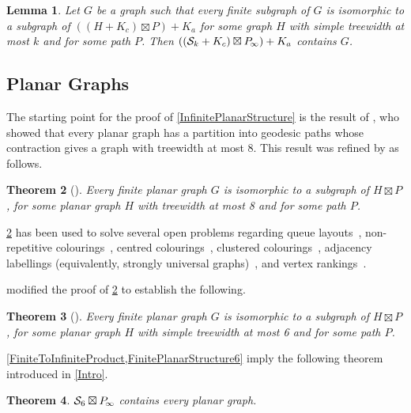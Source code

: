 \documentclass[a4paper,11pt]{article}
\theoremstyle{plain}
\newtheorem{thm}{Theorem}[section]
\newtheorem{lem}[thm]{Lemma}
\theoremstyle{definition}
\newcommand{\PP}{P_{\hspace{-0.25ex}\infty}}
\renewcommand{\SS}{\mathcal{S}}
\begin{document}
\begin{lem}
\label{FiniteToInfiniteSimple}
Let $G$ be a graph such that every finite subgraph of $G$ is isomorphic to a subgraph of $( (H+K_c) \boxtimes P)+K_a$ for some graph $H$ with simple treewidth at most $k$ and for some path $P$. Then $( (\SS_k+K_c) \boxtimes \PP)+K_a$ contains $G$.
\end{lem}

\subsection{Planar Graphs}
\label{PlanarGraphs}

The starting point for the proof of \cref{InfinitePlanarStructure} is the result of \citet{PS18}, who showed that every planar graph has a partition into geodesic paths whose contraction gives a graph with treewidth at most 8. This result was refined by \citet{DJMMUW20} as follows. 

\begin{thm}[\citep{DJMMUW20}]
\label{FinitePlanarStructure}
Every finite planar graph $G$ is isomorphic to a subgraph of $H\boxtimes P$, for some planar graph $H$ with  treewidth at most 8 and for some path $P$.
\end{thm}

\cref{FinitePlanarStructure} has been used to solve several open problems regarding queue layouts~\citep{DJMMUW20}, non-repetitive colourings~\citep{DEJWW20}, centred colourings~\citep{DFMS21}, clustered colourings~\citep{DEMWW}, adjacency labellings (equivalently, strongly universal graphs)~\citep{BGP20,DEJGMM,EJM}, and vertex rankings~\citep{BDJM}.

\citet{UWY} modified the proof of \cref{FinitePlanarStructure} to establish the following.

\begin{thm}[\citep{UWY}]
\label{FinitePlanarStructure6}
Every finite planar graph $G$ is isomorphic to a subgraph of $H\boxtimes P$, for some planar graph $H$ with simple treewidth at most 6 and for some path $P$.
\end{thm}

\cref{FiniteToInfiniteProduct,FinitePlanarStructure6} imply the following theorem introduced in \cref{Intro}. 

\begin{thm}
\label{InfinitePlanarStructure6}
$\SS_6 \boxtimes \PP$ contains every planar graph.
\end{thm}
\end{document}
